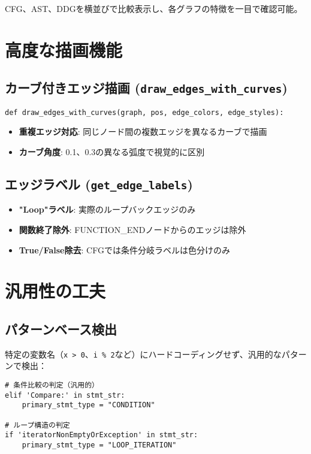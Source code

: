 \documentclass[a4paper,12pt]{article}
\begin{document}
CFG、AST、DDGを横並びで比較表示し、各グラフの特徴を一目で確認可能。

\section{高度な描画機能}

\subsection{カーブ付きエッジ描画 (\texttt{draw\_edges\_with\_curves})}

\begin{lstlisting}[caption=カーブ付きエッジ描画関数]
def draw_edges_with_curves(graph, pos, edge_colors, edge_styles):
\end{lstlisting}

\begin{itemize}
    \item \textbf{重複エッジ対応}: 同じノード間の複数エッジを異なるカーブで描画
    \item \textbf{カーブ角度}: 0.1、0.3の異なる弧度で視覚的に区別
\end{itemize}

\subsection{エッジラベル (\texttt{get\_edge\_labels})}

\begin{itemize}
    \item \textbf{"Loop"ラベル}: 実際のループバックエッジのみ
    \item \textbf{関数終了除外}: FUNCTION\_ENDノードからのエッジは除外
    \item \textbf{True/False除去}: CFGでは条件分岐ラベルは色分けのみ
\end{itemize}

\section{汎用性の工夫}

\subsection{パターンベース検出}

特定の変数名（\texttt{x > 0}、\texttt{i \% 2}など）にハードコーディングせず、汎用的なパターンで検出：

\begin{lstlisting}[caption=汎用的パターン検出]
# 条件比較の判定（汎用的）
elif 'Compare:' in stmt_str:
    primary_stmt_type = "CONDITION"

# ループ構造の判定
if 'iteratorNonEmptyOrException' in stmt_str:
    primary_stmt_type = "LOOP_ITERATION"
\end{lstlisting}
\end{document}
